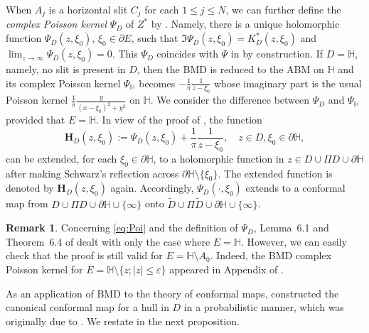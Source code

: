 \documentclass[preprint,12pt]{elsarticle}
\theoremstyle{definition}
\newtheorem{rem}[thm]{Remark}
\newcommand{\uhp}{\mathbb{H}}
\begin{document}
When $A_j$ is a horizontal slit $C_j$ for each $1 \leq j \leq N$,
we can further define the \emph{complex Poisson kernel} $\Psi_D$ of $Z^*$
by \cite[Lemma~6.1]{CFR16}.
Namely, there is a unique holomorphic function
$\Psi_D(z, \xi_0)$, $\xi_0 \in \partial E$, such that
$\Im \Psi_D(z, \xi_0) = K^*_D(z, \xi_0)$
and $\lim_{z \to \infty} \Psi_D(z, \xi_0) = 0$.
This $\Psi_D$ coincides with $\Psi$ in \cite[Section~2.2]{BF08}
by construction. If $D=\uhp$, namely, no slit is present in $D$,
then the BMD is reduced to the ABM on $\uhp$ and its complex Poisson kernel
$\Psi_{\uhp}$ becomes $-\frac{1}{\pi}\frac{1}{z-\xi_0}$
whose imaginary part is the usual Poisson kernel
$\frac{1}{\pi}\frac{y}{(x-\xi_0)^2+y^2}$ on $\uhp$.
We consider the difference between $\Psi_D$ and $\Psi_{\uhp}$
provided that $E=\uhp$.
In view of the proof of \cite[Lemma~5.6]{CF18}, the function
\begin{equation} \label{eq:PK}
\mathbf{H}_D(z, \xi_0):=\Psi_D(z, \xi_0)+\frac{1}{\pi}\frac{1}{z-\xi_0},
\quad z \in D, \xi_0 \in \partial \uhp,
\end{equation}
can be extended, for each $\xi_0 \in \partial \uhp$, to a holomorphic function
in $z \in D \cup \Pi D \cup \partial \uhp$
after making Schwarz's reflection across $\partial \uhp \setminus \{\xi_0\}$.
The extended function is denoted by $\mathbf{H}_D(z, \xi_0)$ again.
Accordingly, $\Psi_{D}(\cdot, \xi_0)$ extends to a conformal map
from $D \cup \Pi D \cup \partial \uhp \cup \{\infty\}$
onto $\tilde{D} \cup \Pi \tilde{D} \cup \partial \uhp \cup \{\infty\}$.

\begin{rem}
Concerning \eqref{eq:Poi} and the definition of $\Psi_D$,
Lemma~6.1 and Theorem~6.4 of \cite{CFR16} dealt with only the case
where $E=\uhp$.
However, we can easily check that the proof is still valid
for $E=\uhp \setminus A_0$.
Indeed, the BMD complex Poisson kernel for
$E=\uhp \setminus \{z; \lvert z \rvert \leq \varepsilon\}$
appeared in Appendix of \cite{CF18}.
\end{rem}

As an application of BMD to the theory of conformal maps,
\cite[Theorem~7.2]{CFR16} constructed the canonical conformal map
for a hull in $D$ in a probabilistic manner,
which was originally due to \cite[Corollary~3.1]{La06}.
We restate \cite[Theorem~7.2]{CFR16} in the next proposition.
\end{document}
